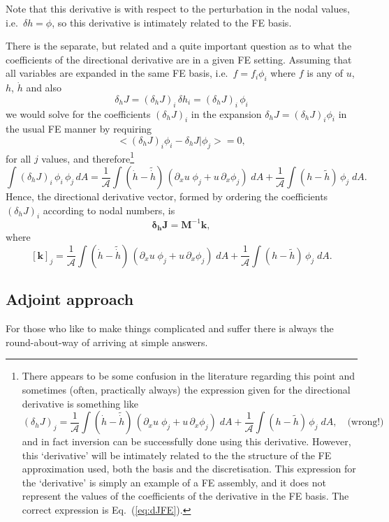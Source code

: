\documentclass[10pt,a4paper]{book}
\newcommand{\p}{\partial}
\begin{document}
Note that this derivative is with respect to the perturbation in the
nodal values, i.e.\ $\delta h = \phi$, so this derivative is
intimately related to the FE basis.

There is the separate, but related and a quite important question as
to what the coefficients of the directional derivative are in a given
FE setting. Assuming that all variables are expanded in the same FE
basis, i.e.\ $f=f_i \phi_i$ where $f$ is any of $u$, $h$, $\dot{h}$
and also
\[
\delta_h J = (\delta_h J)_i \, \delta h_i = (\delta_h J)_i \, \phi_i
\]
we would solve for the coefficients $(\delta_h J)_i$ in the expansion
$\delta_h J = (\delta_h J)_i \phi_i$ in the usual FE manner by requiring
\[
 < (\delta_h J)_i \phi_i- \delta_h J  | \phi_j> =0 ,
 \]
 for all $j$ values, and therefore\footnote{There appears to be some confusion in the literature
  regarding this point and sometimes (often, practically always)
  the expression given for the directional derivative is something like
\[
(\delta_h J)_j    = \frac{1}{\mathcal{A}} \int \left (\dot{h} - \tilde{\dot{h}} \right ) \,   (\p_x u \; \phi_j + u \, \p_x \phi_j) \; dA + \frac{1}{\mathcal{A}} \int \left ( h - \tilde{h} \right ) \, \phi_j \; dA  ,
\quad \text{(wrong!)}
\]
and in fact inversion can be successfully done using this
derivative. However, this `derivative' will be intimately related to the
the structure of the FE approximation used, both the basis and the
discretisation. This expression for the `derivative' is simply an
example of a FE assembly, and it does not represent the values of the
coefficients of the derivative in the FE basis. The correct expression is Eq.~(\ref{eq:dJFE}). }
\begin{equation}
\int (\delta_h J)_i \, \phi_i \, \phi_j\, dA = \frac{1}{\mathcal{A}}
\int \left (\dot{h} - \tilde{\dot{h}} \right ) \, (\p_x u \; \phi_j +
u \, \p_x \phi_j) \; dA + \frac{1}{\mathcal{A}} \int \left ( h -
\tilde{h} \right ) \, \phi_j \; dA .
\label{eq:dJFE}
\end{equation}
Hence, the directional derivative vector, formed by ordering the
coefficients $(\delta_h J)_i$ according to nodal numbers, is
\[
\bm{\delta_h J} = \bm{M}^{-1} \bm{k} ,
\]
where
\[
[\bm{k}]_j = \frac{1}{\mathcal{A}} \int \left (\dot{h} - \tilde{\dot{h}} \right ) \,  (\p_x u \; \phi_j + u \, \p_x \phi_j) \; dA + \frac{1}{\mathcal{A}} \int \left ( h - \tilde{h} \right ) \, \phi_j \; dA .
\]


\subsection{Adjoint approach}
For those who like to make things complicated and suffer there is
always the round-about-way of arriving at simple answers.
\end{document}
